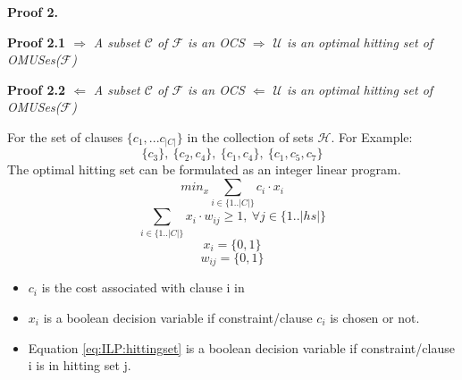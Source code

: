 \documentclass{article}
\newcommand\m[1]{\mathcal{#1}}
\begin{document}
\textbf{Proof 2.}

\textbf{Proof 2.1 $\Rightarrow$} \textit{A subset $\m{C}$ of $\m{F}$ is an OCS $\Rightarrow$ $\m{U}$ is an optimal hitting set of OMUSes($\m{F}$)} 

\textbf{Proof 2.2 $\Leftarrow$} \textit{A subset $\m{C}$ of $\m{F}$ is an OCS $\Leftarrow$ $\m{U}$ is an optimal hitting set of OMUSes($\m{F}$)} 

\newpage



\newpage
For the set of clauses $\{c_1, ... c_{|C|}\}$ in the collection of sets $\m{H}$. For Example:
\[ \{c_3 \},\ \{c_2, c_4\},\ \{c_1, c_4\},\ \{c_1, c_5, c_7\} \]
The optimal hitting set can be formulated as an integer linear program.
\begin{equation} \label{eq:ILP:objective}
  min_{x} \sum_{ i \in \{1..|C|\}} c_i \cdot x_i
\end{equation}
\begin{equation} \label{eq:ILP:hittingset}
  \sum_{i \in \{1..|C|\}} x_i \cdot w_{ij} \geq 1, \  \forall j \in \{1..|hs|\}
\end{equation}
\begin{equation} \label{eq:ILP:bool:xi}
  x_i = \{0,1\}
\end{equation}
\begin{equation} \label{eq:ILP:bool:wij}
  w_{ij} = \{0, 1\}
\end{equation}
\begin{itemize}
  \item $c_i$ is the cost associated with clause i in
  \item $x_i$ is a boolean decision variable if constraint/clause $c_i$ is chosen or not.
  \item Equation \ref{eq:ILP:hittingset} is a boolean decision variable if constraint/clause i is in hitting set j.
\end{itemize}

\newpage


\end{document}
